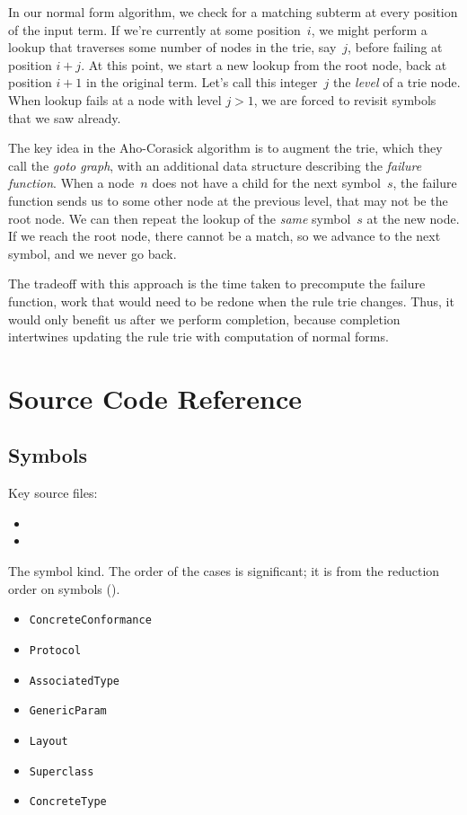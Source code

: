 \documentclass[../generics]{subfiles}
\begin{document}
In our normal form algorithm, we check for a matching subterm at every position of the input term. If we're currently at some position~$i$, we might perform a lookup that traverses some number of nodes in the trie, say~$j$, before failing at position $i+j$. At this point, we start a new lookup from the root node, back at position $i+1$ in the original term. Let's call this integer~$j$ the \emph{level} of a trie node. When lookup fails at a node with level $j>1$, we are forced to revisit symbols that we saw already.

The key idea in the Aho-Corasick algorithm is to augment the trie, which they call the \emph{goto graph}, with an additional data structure describing the \emph{failure function}. When a node~$n$ does not have a child for the next symbol~$s$, the failure function sends us to some other node at the previous level, that may not be the root node. We can then repeat the lookup of the \emph{same} symbol~$s$ at the new node. If we reach the root node, there cannot be a match, so we advance to the next symbol, and we never go back.

The tradeoff with this approach is the time taken to precompute the failure function, work that would need to be redone when the rule trie changes. Thus, it would only benefit us after we perform completion, because completion intertwines updating the rule trie with computation of normal forms.

\section{Source Code Reference}\label{symbols terms rules sourceref}

\subsection*{Symbols}

Key source files:
\begin{itemize}
\item {}
\item {}
\end{itemize}

The symbol kind. The order of the cases is significant; it is from the reduction order on symbols ().
\begin{itemize}
\item \texttt{ConcreteConformance}
\item \texttt{Protocol}
\item \texttt{AssociatedType}
\item \texttt{GenericParam}
\item \texttt{Layout}
\item \texttt{Superclass}
\item \texttt{ConcreteType}
\end{itemize}
\end{document}
